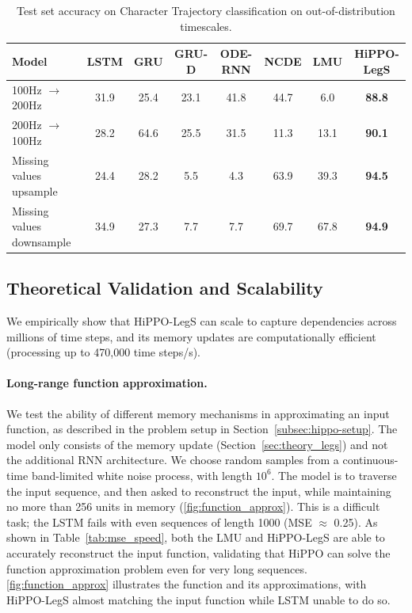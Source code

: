 \begin{table}[ht]
    \small
    \centering
    \caption{Test set accuracy on Character Trajectory classification on out-of-distribution timescales.   }
    \begin{tabular}{lccccccc}
        \toprule
        Model                     & \textbf{LSTM} & \textbf{GRU} & \textbf{GRU-D} & \textbf{ODE-RNN} & \textbf{NCDE} & \textbf{LMU} & \textbf{HiPPO-LegS} \\
        \midrule
        100Hz $\to$ 200Hz         & 31.9          & 25.4         & 23.1           & 41.8             & 44.7          & 6.0          & \textbf{88.8}       \\
        200Hz $\to$ 100Hz         & 28.2          & 64.6         & 25.5           & 31.5             & 11.3          & 13.1         & \textbf{90.1}       \\
        \midrule
        Missing values upsample   & 24.4          & 28.2         & 5.5            & 4.3              & 63.9          & 39.3         & \textbf{94.5}       \\
        Missing values downsample & 34.9          & 27.3         & 7.7            & 7.7              & 69.7          & 67.8         & \textbf{94.9}       \\
        \bottomrule
    \end{tabular}
    \label{tab:charactertrajectories}
\end{table}




\subsection{Theoretical Validation and Scalability}
\label{subsec:exp-scalability}

We empirically show that HiPPO-LegS can scale to capture dependencies
across millions of time steps, and its memory updates are computationally
efficient (processing up to 470,000 time steps/s).

\paragraph{Long-range function approximation.}
We test the ability of
different memory mechanisms in approximating an input function, as described in
the problem setup in Section~\ref{subsec:hippo-setup}.
The model only consists of the memory update (Section~\ref{sec:theory_legs}) and
not the additional RNN architecture.
We choose random samples from a continuous-time band-limited white noise
process, with length $10^6$.
The model is to traverse the input sequence, and then asked to reconstruct the
input, while maintaining no more than 256 units in memory (\cref{fig:function_approx}).
This is a difficult task; the LSTM fails with even sequences of length 1000 (MSE
$\approx$ 0.25).
As shown in Table~\ref{tab:mse_speed}, both the LMU and HiPPO-LegS are able to
accurately reconstruct the input function, validating that HiPPO can solve the
function approximation problem even for very long sequences.
\cref{fig:function_approx} illustrates the function and its approximations, with
HiPPO-LegS almost matching the input function while LSTM unable to do so.

